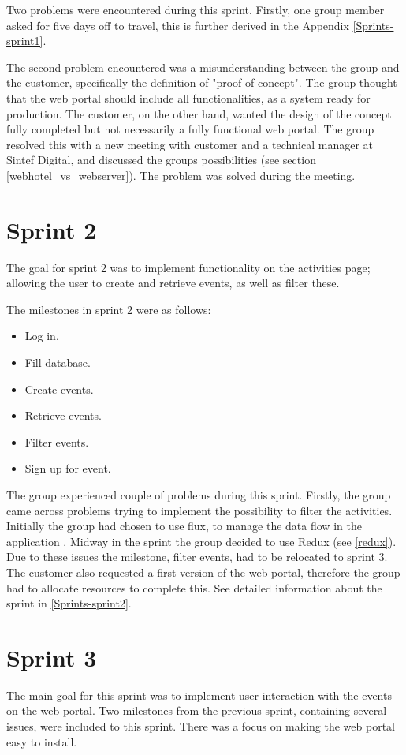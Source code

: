 Two problems were encountered during this sprint. Firstly, one group member asked for five days off to travel, this is further derived in the Appendix \ref{Sprints-sprint1}.

The second problem encountered was a misunderstanding between the group and the customer, specifically the definition of "proof of concept". The group thought that the web portal should include all functionalities, as a system ready for production. The customer, on the other hand, wanted the design of the concept fully completed but not necessarily a fully functional web portal. The group resolved this with a new meeting with customer and a technical manager at Sintef Digital, and discussed the groups possibilities (see section \ref{webhotel_vs_webserver}). The problem was solved during the meeting.


\section{Sprint 2} 
\label{sprint2}
The goal for sprint 2 was to implement functionality on the activities page; allowing the user to create and retrieve events, as well as filter these. 

The milestones in sprint 2 were as follows:
\begin{itemize}
  \item Log in.
  \item Fill database.
  \item Create events.
  \item Retrieve events.
  \item Filter events.
  \item Sign up for event.
\end{itemize}

The group experienced couple of problems during this sprint. Firstly, the group came across problems trying to implement the possibility to filter the activities. Initially the group had chosen to use flux, to manage the data flow in the application \cite{flux}. Midway in the sprint the group decided to use Redux (see \ref{redux}). Due to these issues the milestone, filter events, had to be relocated to sprint 3. The customer also requested a first version of the web portal, therefore the group had to allocate resources to complete this. See detailed information about the sprint in \ref{Sprints-sprint2}.


\section{Sprint 3}
\label{sprint3}
The main goal for this sprint was to implement user interaction with the events on the web portal. Two milestones from the previous sprint, containing several issues, were included to this sprint. There was a focus on making the web portal easy to install. 

